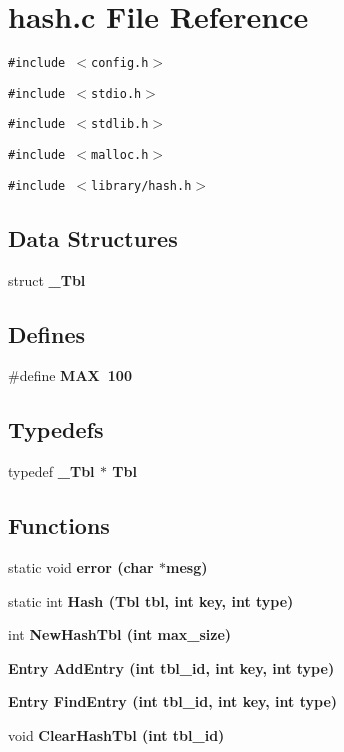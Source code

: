 \section{hash.c File Reference}
\label{hash_8c}
{\tt \#include $<$config.h$>$}\par
{\tt \#include $<$stdio.h$>$}\par
{\tt \#include $<$stdlib.h$>$}\par
{\tt \#include $<$malloc.h$>$}\par
{\tt \#include $<$library/hash.h$>$}\par
\subsection*{Data Structures}
\begin{CompactItemize}
\item 
struct \bf{\_\-Tbl}
\end{CompactItemize}
\subsection*{Defines}
\begin{CompactItemize}
\item 
\#define \bf{MAX}~100
\end{CompactItemize}
\subsection*{Typedefs}
\begin{CompactItemize}
\item 
typedef \bf{\_\-Tbl} $\ast$ \bf{Tbl}
\end{CompactItemize}
\subsection*{Functions}
\begin{CompactItemize}
\item 
static void \bf{error} (char $\ast$mesg)
\item 
static int \bf{Hash} (\bf{Tbl} tbl, int key, int type)
\item 
int \bf{New\-Hash\-Tbl} (int max\_\-size)
\item 
\bf{Entry} \bf{Add\-Entry} (int tbl\_\-id, int key, int type)
\item 
\bf{Entry} \bf{Find\-Entry} (int tbl\_\-id, int key, int type)
\item 
void \bf{Clear\-Hash\-Tbl} (int tbl\_\-id)
\end{CompactItemize}
